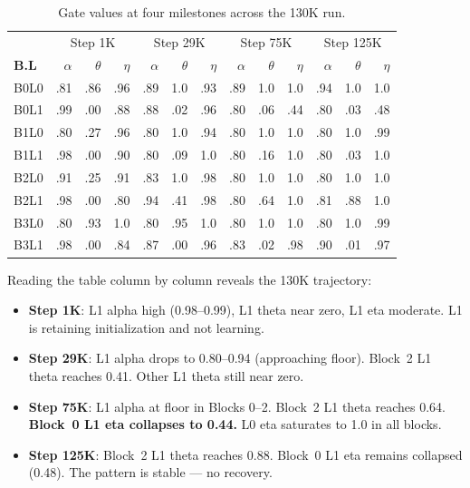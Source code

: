 \documentclass[11pt,a4paper]{article}
\begin{document}
\begin{table}[H]
\centering
\caption{Gate values at four milestones across the 130K run.}
\small
\begin{tabular}{l|rrr|rrr|rrr|rrr}
\toprule
& \multicolumn{3}{c|}{Step 1K} & \multicolumn{3}{c|}{Step 29K} & \multicolumn{3}{c|}{Step 75K} & \multicolumn{3}{c}{Step 125K} \\
\textbf{B.L} & $\alpha$ & $\theta$ & $\eta$ & $\alpha$ & $\theta$ & $\eta$ & $\alpha$ & $\theta$ & $\eta$ & $\alpha$ & $\theta$ & $\eta$ \\
\midrule
B0L0 & .81 & .86 & .96 & .89 & 1.0 & .93 & .89 & 1.0 & 1.0 & .94 & 1.0 & 1.0 \\
B0L1 & .99 & .00 & .88 & .88 & .02 & .96 & .80 & .06 & \textcolor{danger}{.44} & .80 & .03 & \textcolor{danger}{.48} \\
B1L0 & .80 & .27 & .96 & .80 & 1.0 & .94 & .80 & 1.0 & 1.0 & .80 & 1.0 & .99 \\
B1L1 & .98 & .00 & .90 & .80 & .09 & 1.0 & .80 & .16 & 1.0 & .80 & .03 & 1.0 \\
B2L0 & .91 & .25 & .91 & .83 & 1.0 & .98 & .80 & 1.0 & 1.0 & .80 & 1.0 & 1.0 \\
B2L1 & .98 & .00 & .80 & .94 & .41 & .98 & .80 & .64 & 1.0 & .81 & \textcolor{warning}{.88} & 1.0 \\
B3L0 & .80 & .93 & 1.0 & .80 & .95 & 1.0 & .80 & 1.0 & 1.0 & .80 & 1.0 & .99 \\
B3L1 & .98 & .00 & .84 & .87 & .00 & .96 & .83 & .02 & .98 & .90 & .01 & .97 \\
\bottomrule
\end{tabular}
\end{table}

\noindent Reading the table column by column reveals the 130K trajectory:
\begin{itemize}
    \item \textbf{Step 1K}: L1 alpha high (0.98--0.99), L1 theta near zero, L1 eta moderate. L1 is retaining initialization and not learning.
    \item \textbf{Step 29K}: L1 alpha drops to 0.80--0.94 (approaching floor). Block~2 L1 theta reaches 0.41. Other L1 theta still near zero.
    \item \textbf{Step 75K}: L1 alpha at floor in Blocks 0--2. Block~2 L1 theta reaches 0.64. \textbf{Block~0 L1 eta collapses to 0.44.} L0 eta saturates to 1.0 in all blocks.
    \item \textbf{Step 125K}: Block~2 L1 theta reaches 0.88. Block~0 L1 eta remains collapsed (0.48). The pattern is stable --- no recovery.
\end{itemize}
\end{document}
